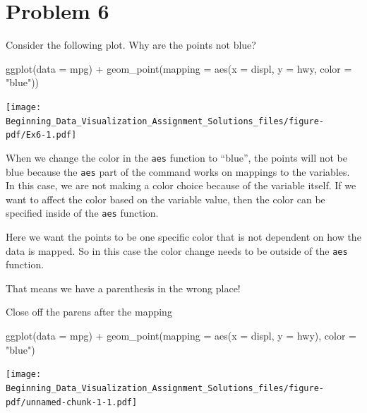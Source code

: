 \documentclass[
  letterpaper,
  DIV=11,
  numbers=noendperiod]{scrreprt}
\newenvironment{Shaded}{\begin{snugshade}}{\end{snugshade}}
\newcommand{\AttributeTok}[1]{\textcolor[rgb]{0.40,0.45,0.13}{#1}}
\newcommand{\FunctionTok}[1]{\textcolor[rgb]{0.28,0.35,0.67}{#1}}
\newcommand{\NormalTok}[1]{\textcolor[rgb]{0.00,0.23,0.31}{#1}}
\newcommand{\SpecialCharTok}[1]{\textcolor[rgb]{0.37,0.37,0.37}{#1}}
\newcommand{\StringTok}[1]{\textcolor[rgb]{0.13,0.47,0.30}{#1}}
\begin{document}
\section*{Problem 6}\label{problem-6-3}


Consider the following plot. Why are the points not blue?

\begin{Shaded}
\begin{Highlighting}[]
 \FunctionTok{ggplot}\NormalTok{(}\AttributeTok{data =}\NormalTok{ mpg) }\SpecialCharTok{+} 
  \FunctionTok{geom\_point}\NormalTok{(}\AttributeTok{mapping =} \FunctionTok{aes}\NormalTok{(}\AttributeTok{x =}\NormalTok{ displ, }\AttributeTok{y =}\NormalTok{ hwy, }\AttributeTok{color =} \StringTok{"blue"}\NormalTok{))}
\end{Highlighting}
\end{Shaded}

\texttt{[image: Beginning\_Data\_Visualization\_Assignment\_Solutions\_files/figure-pdf/Ex6-1.pdf]}

When we change the color in the \texttt{aes} function to ``blue'', the
points will not be blue because the \texttt{aes} part of the command
works on mappings to the variables. In this case, we are not making a
color choice because of the variable itself. If we want to affect the
color based on the variable value, then the color can be specified
inside of the \texttt{aes} function.

Here we want the points to be one specific color that is not dependent
on how the data is mapped. So in this case the color change needs to be
outside of the \texttt{aes} function.

That means we have a parenthesis in the wrong place!

Close off the parens after the mapping

\begin{Shaded}
\begin{Highlighting}[]
\FunctionTok{ggplot}\NormalTok{(}\AttributeTok{data =}\NormalTok{ mpg) }\SpecialCharTok{+} 
  \FunctionTok{geom\_point}\NormalTok{(}\AttributeTok{mapping =} \FunctionTok{aes}\NormalTok{(}\AttributeTok{x =}\NormalTok{ displ, }\AttributeTok{y =}\NormalTok{ hwy), }\AttributeTok{color =} \StringTok{"blue"}\NormalTok{)}
\end{Highlighting}
\end{Shaded}

\texttt{[image: Beginning\_Data\_Visualization\_Assignment\_Solutions\_files/figure-pdf/unnamed-chunk-1-1.pdf]}
\end{document}
